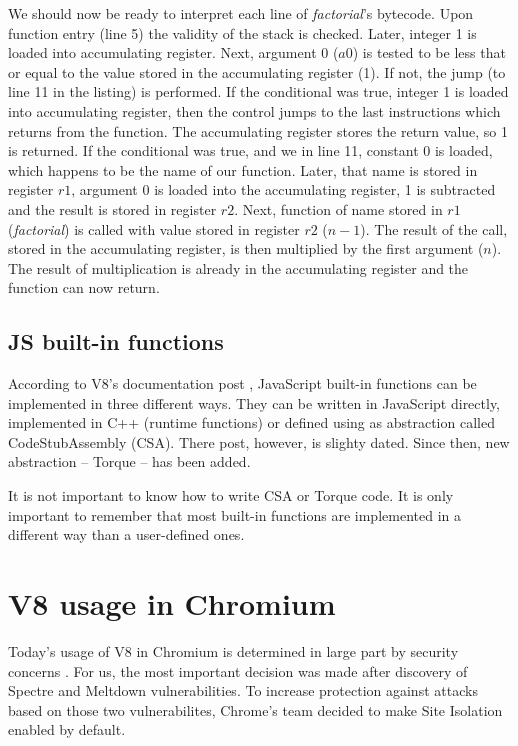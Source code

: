 We should now be ready to interpret each line of \emph{factorial}'s bytecode.
Upon function entry (line 5) the validity of the stack is checked. Later, integer 1 is loaded into
accumulating register. Next, argument 0 ($a0$) is tested 
to be less that or equal to the value stored in the accumulating register (1).
If not, the jump (to line 11 in the listing) is performed. If the conditional was true, integer 1 is loaded
into accumulating register, then the control jumps to the last instructions which returns from the function.
The accumulating register stores the return value, so 1 is returned.
If the conditional was true, and we in line 11, constant 0 is loaded, which happens to be the name of our function.
Later, that name is stored in register $r1$, argument 0 is loaded into the accumulating register, 1 is subtracted and the result
is stored in register $r2$. Next, function of name stored in $r1$ (\emph{factorial}) is called with value stored in 
register $r2$ ($n-1$). The result of the call, stored in the accumulating register, is then multiplied by the first argument
($n$). The result of multiplication is already in the accumulating register and the function can now return.

\subsection{JS built-in functions}
\label{v8-builtins}

According to V8's documentation post \cite{v8:built-ins}, JavaScript built-in functions can be implemented
in three different ways. They can be written in JavaScript directly, implemented in C++ (runtime functions)
or defined using as abstraction called CodeStubAssembly (CSA). There post, however, is slighty dated. Since then,
new abstraction -- Torque \cite{v8:torque} -- has been added.

It is not important to know how to write CSA or Torque code. It is only important to remember 
that most built-in functions are implemented in a different way than a user-defined ones.

\section{V8 usage in Chromium}
\label{v8-in-chrome}

Today's usage of V8 in Chromium is determined in large part by security concerns \cite{v8:spectre}.
For us, the most important decision was made after discovery of Spectre \cite{Kocher2018spectre} 
and Meltdown \cite{Lipp2018meltdown} vulnerabilities.
To increase protection against attacks based on those two vulnerabilites, Chrome's team decided to make
Site Isolation enabled by default. \cite{chrome:site-isolation}

